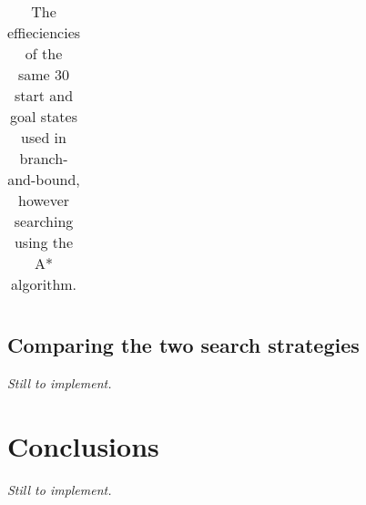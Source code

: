 \documentclass[11pt,oneside]{article}
\begin{document}
\begin{table}[ht]
\begin{tabular}{|c|c|c|}
    \end{tabular}
    \caption{The effieciencies of the same 30 start and goal states used in branch-and-bound, however searching using the A* algorithm.}
    \label{tab:astareff}
\end{table}

\subsection{Comparing the two search strategies}
\textit{Still to implement.}

\section{Conclusions}
\textit{Still to implement.}
\end{document}
